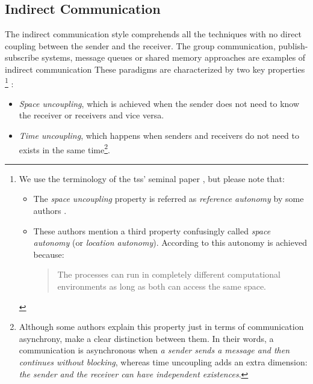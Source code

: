 \subsection{Indirect Communication}
\label{sec:indirect_communication}

The indirect communication style comprehends all the techniques with no direct coupling between the sender and the receiver.
The group communication, publish-subscribe systems, message queues or shared memory approaches are examples of indirect communication
These paradigms are characterized by two key properties \citep{gelernter_generative_1985,coulouris_distributed_2012}
\footnote{
  We use the terminology of the  \aclp{ts}' seminal paper \citep{gelernter_generative_1985}, but please note that:
  \begin{itemize}
    \item The \emph{space uncoupling} property is referred as \emph{reference autonomy} by some authors \citep{fensel_triple-space_2004}.
    \item These authors mention a third property confusingly called \emph{space autonomy} (or \emph{location autonomy}).
	  According to \citet{fensel_triple-space_2004} this autonomy is achieved because:
	  \begin{quote}
	    The processes can run in completely different computational environments as long as both can access the same space.
	  \end{quote}
  \end{itemize}
}
:

\begin{itemize}
 \item \emph{Space uncoupling}, which is achieved when the sender does not need to know the receiver or receivers and vice versa.
 \item \emph{Time uncoupling}, which happens when senders and receivers do not need to exists in the same time\footnote{
	  Although some authors \citep{fensel_triple-space_2004,krummenacher_www_2005} explain this property just in terms of communication asynchrony,
	  \citet{coulouris_distributed_2012} make a clear distinction between them.
	  In their words, a communication is asynchronous when \emph{a sender sends a message and then continues without blocking},
	  whereas time uncoupling adds an extra dimension: \emph{the sender and the receiver can have independent existences}.
	  }.
 
\end{itemize}

